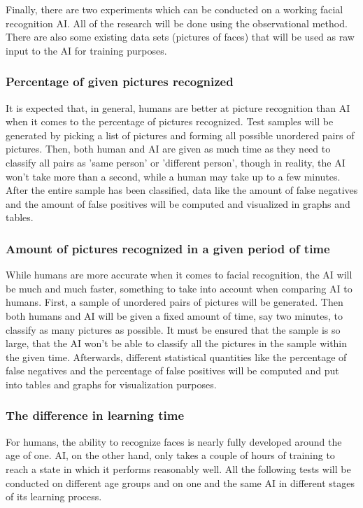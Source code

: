 \documentclass[12pt, titlepage]{article}
\begin{document}
		Finally, there are two experiments which can be conducted on a working facial recognition AI. All of the research will be done using the observational method. There are also some existing data sets (pictures of faces) that will be used as raw input to the AI for training purposes.
		
		\subsubsection{Percentage of given pictures recognized}
		It is expected that, in general, humans are better at picture recognition than AI when it comes to the percentage of pictures recognized. Test samples will be generated by picking a list of pictures and forming all possible unordered pairs of pictures. Then, both human and AI are given as much time as they need to classify all pairs as 'same person' or 'different person', though in reality, the AI won't take more than a second, while a human may take up to a few minutes. After the entire sample has been classified, data like the amount of false negatives and the amount of false positives will be computed and visualized in graphs and tables.
		
		\subsubsection{Amount of pictures recognized in a given period of time}While humans are more accurate when it comes to facial recognition, the AI will be much and much faster, something to take into account when comparing AI to humans. First, a sample of unordered pairs of pictures will be generated. Then both humans and AI will be given a fixed amount of time, say two minutes, to classify as many pictures as possible. It must be ensured that the sample is so large, that the AI won't be able to classify all the pictures in the sample within the given time. Afterwards, different statistical quantities like the percentage of false negatives and the percentage of false positives will be computed and put into tables and graphs for visualization purposes.
		
		\subsubsection{The difference in learning time}
		For humans, the ability to recognize faces is nearly fully developed around the age of one. AI, on the other hand, only takes a couple of hours of training to reach a state in which it performs reasonably well. All the following tests will be conducted on different age groups and on one and the same AI in different stages of its learning process.
		
\end{document}
